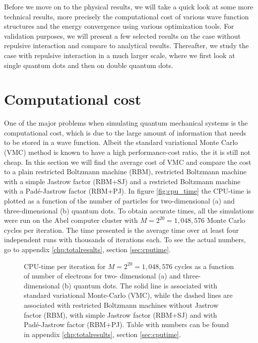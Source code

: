Before we move on to the physical results, we will take a quick look at some more technical results, more precisely the computational cost of various wave function structures and the energy convergence using various optimization tools. For validation purposes, we will present a few selected results on the case without repulsive interaction and compare to analytical results. Thereafter, we study the case with repulsive interaction in a much larger scale, where we first look at single quantum dots and then on double quantum dots.  

\section{Computational cost}
One of the major problems when simulating quantum mechanical systems is the computational cost, which is due to the large amount of information that needs to be stored in a wave function. Albeit the standard variational Monte Carlo (VMC) method is known to have a high performance-cost ratio, the it is still not cheap. In this section we will find the average cost of VMC and compare the cost to a plain restricted Boltzmann machine (RBM), restricted Boltzmann machine with a simple Jastrow factor (RBM+SJ) and a restricted Boltzmann machine with a Padé-Jastrow factor (RBM+PJ). In figure \eqref{fig:cpu_time} the CPU-time is plotted as a function of the number of particles for two-dimensional (a) and three-dimensional (b) quantum dots. To obtain accurate times, all the simulations were run on the Abel computer cluster with $M=2^{20}=1,048,576$ Monte Carlo cycles per iteration. The time presented is the average time over at least four independent runs with thousands of iterations each. To see the actual numbers, go to appendix \ref{chp:totalresults}, section \ref{sec:cputime}. 

\begin{figure}[H]
	\centering 
	\subfloat[2D]{{}}
	\subfloat[3D]{{}}
	\caption{CPU-time per iteration for $M=2^{20}=1,048,576$ cycles as a function of number of electrons for two- dimensional (a) and three-dimensional (b) quantum dots. The solid line is associated with standard variational Monte-Carlo (VMC), while the dashed lines are associated with restricted Boltzmann machines without Jastrow factor (RBM), with simple Jastrow factor (RBM+SJ) and with Padé-Jastrow factor (RBM+PJ). Table with numbers can be found in appendix \ref{chp:totalresults}, section \ref{sec:cputime}.}
	\label{fig:cpu_time}
\end{figure} 

